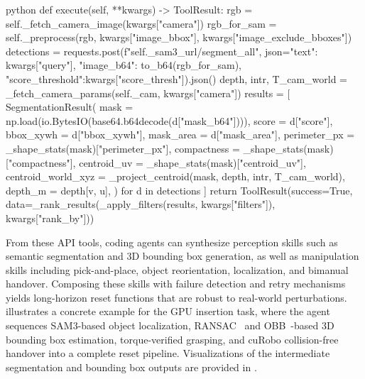 \begin{appendixcode}{python}
    def execute(self, **kwargs) -> ToolResult:
        rgb         = self._fetch_camera_image(kwargs["camera"])
        rgb_for_sam = self._preprocess(rgb, kwargs["image_bbox"],
                                       kwargs["image_exclude_bboxes"])
        detections  = requests.post(f"{self._sam3_url}/segment_all",
                          json={"text":           kwargs["query"],
                                "image_b64":      to_b64(rgb_for_sam),
                                "score_threshold":kwargs["score_thresh"]}).json()
        depth, intr, T_cam_world = _fetch_camera_params(self._cam, kwargs["camera"])
        results = [
            SegmentationResult(
                mask               = np.load(io.BytesIO(base64.b64decode(d["mask_b64"]))),
                score              = d["score"],
                bbox_xywh          = d["bbox_xywh"],
                mask_area          = d["mask_area"],
                perimeter_px       = _shape_stats(mask)["perimeter_px"],
                compactness        = _shape_stats(mask)["compactness"],
                centroid_uv        = _shape_stats(mask)["centroid_uv"],
                centroid_world_xyz = _project_centroid(mask, depth, intr, T_cam_world),
                depth_m            = depth[v, u],
            ) for d in detections
        ]
        return ToolResult(success=True,
                          data=_rank_results(_apply_filters(results,
                                             kwargs["filters"]), kwargs["rank_by"]))
\end{appendixcode}

\vspace{0.5cm}
From these API tools, coding agents can synthesize perception skills such as semantic segmentation and 3D bounding box generation, as well as manipulation skills including pick-and-place, object reorientation, localization, and bimanual handover. Composing these skills with failure detection and retry mechanisms yields long-horizon reset functions that are robust to real-world perturbations.  illustrates a concrete example for the GPU insertion task, where the agent sequences SAM3-based object localization, RANSAC~\cite{ransac} and OBB~\cite{obb}-based 3D bounding box estimation, torque-verified grasping, and cuRobo collision-free handover into a complete reset pipeline. Visualizations of the intermediate segmentation and bounding box outputs are provided in .




